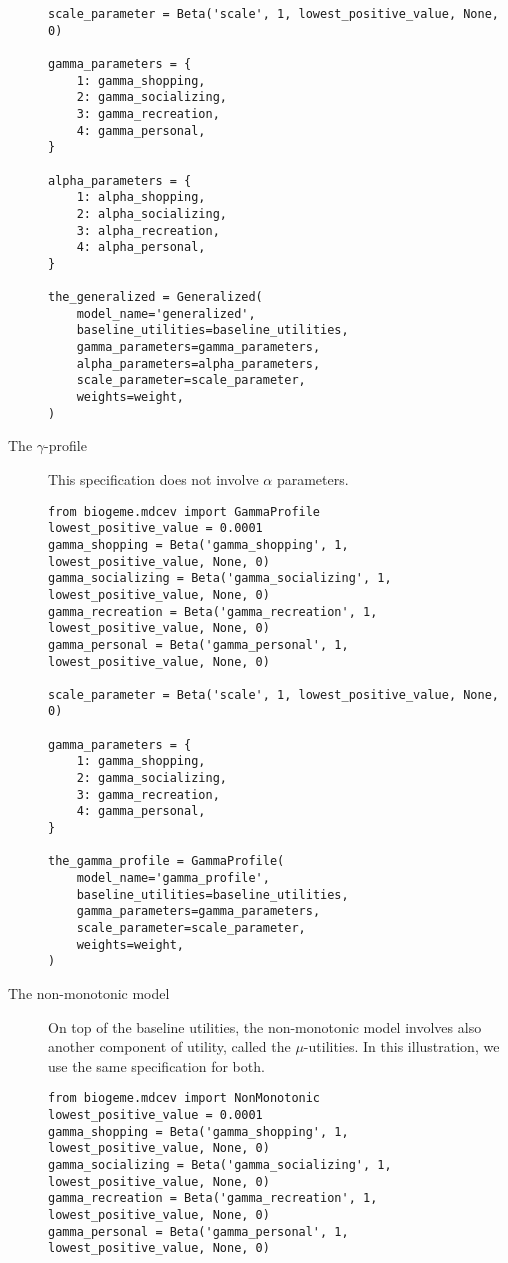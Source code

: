 \documentclass[12pt,a4paper]{article}
\begin{document}
\begin{description}
\begin{center}
\begin{lstlisting}
scale_parameter = Beta('scale', 1, lowest_positive_value, None, 0)

gamma_parameters = {
    1: gamma_shopping,
    2: gamma_socializing,
    3: gamma_recreation,
    4: gamma_personal,
}

alpha_parameters = {
    1: alpha_shopping,
    2: alpha_socializing,
    3: alpha_recreation,
    4: alpha_personal,
}

the_generalized = Generalized(
    model_name='generalized',
    baseline_utilities=baseline_utilities,
    gamma_parameters=gamma_parameters,
    alpha_parameters=alpha_parameters,
    scale_parameter=scale_parameter,
    weights=weight,
)
         \end{lstlisting}
     \end{center}
    \item [The $\gamma$-profile] This specification does not involve $\alpha$ parameters.
    \begin{center}
         \begin{lstlisting}
from biogeme.mdcev import GammaProfile
lowest_positive_value = 0.0001
gamma_shopping = Beta('gamma_shopping', 1, lowest_positive_value, None, 0)
gamma_socializing = Beta('gamma_socializing', 1, lowest_positive_value, None, 0)
gamma_recreation = Beta('gamma_recreation', 1, lowest_positive_value, None, 0)
gamma_personal = Beta('gamma_personal', 1, lowest_positive_value, None, 0)

scale_parameter = Beta('scale', 1, lowest_positive_value, None, 0)

gamma_parameters = {
    1: gamma_shopping,
    2: gamma_socializing,
    3: gamma_recreation,
    4: gamma_personal,
}

the_gamma_profile = GammaProfile(
    model_name='gamma_profile',
    baseline_utilities=baseline_utilities,
    gamma_parameters=gamma_parameters,
    scale_parameter=scale_parameter,
    weights=weight,
)
         \end{lstlisting}
     \end{center}
    \item[The non-monotonic model] On top of the baseline utilities, the non-monotonic model involves also another component of
    utility, called the $\mu$-utilities. In this illustration, we use the same specification for both.
    \begin{center}
         \begin{lstlisting}
from biogeme.mdcev import NonMonotonic
lowest_positive_value = 0.0001
gamma_shopping = Beta('gamma_shopping', 1, lowest_positive_value, None, 0)
gamma_socializing = Beta('gamma_socializing', 1, lowest_positive_value, None, 0)
gamma_recreation = Beta('gamma_recreation', 1, lowest_positive_value, None, 0)
gamma_personal = Beta('gamma_personal', 1, lowest_positive_value, None, 0)


\end{lstlisting}
\end{center}
\end{description}
\end{document}
